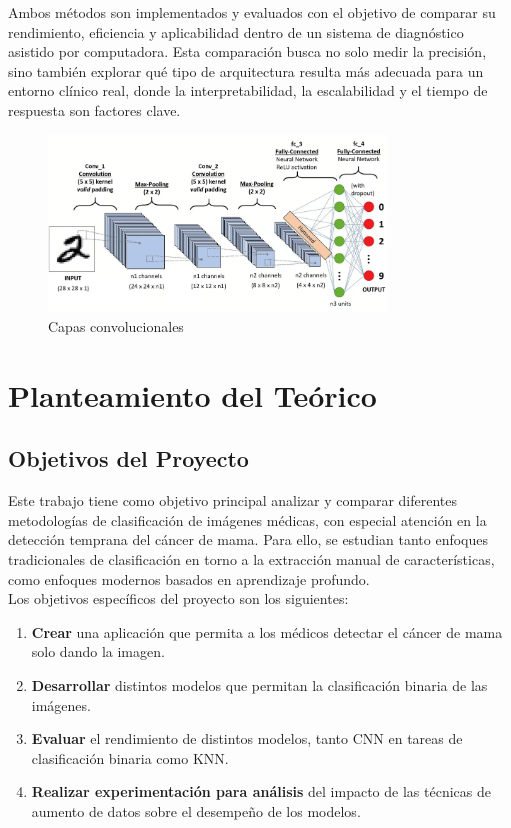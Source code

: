 \documentclass[12pt]{article} %
\begin{document}
Ambos métodos son implementados y evaluados con el objetivo de comparar su rendimiento, eficiencia y aplicabilidad dentro de un sistema de diagnóstico asistido por computadora. Esta comparación busca no solo medir la precisión, sino también explorar qué tipo de arquitectura resulta más adecuada para un entorno clínico real, donde la interpretabilidad, la escalabilidad y el tiempo de respuesta son factores clave.
\\

\begin{figure}[!ht]
    \centering
    \includegraphics[width=0.8\textwidth]{CNN.png}
    \caption{Capas convolucionales \cite{datacamp_cnn}}
    \label{fig:capas_convolucionales}
\end{figure}

\newpage
\section{Planteamiento del Teórico}
\subsection{Objetivos del Proyecto}

Este trabajo tiene como objetivo principal analizar y comparar diferentes metodologías de clasificación de imágenes médicas, con especial atención en la detección temprana del cáncer de mama. Para ello, se estudian tanto enfoques tradicionales de clasificación en torno a la extracción manual de características, como enfoques modernos basados en aprendizaje profundo.\\

Los objetivos específicos del proyecto son los siguientes:\\

\begin{enumerate}
    \item \textbf{Crear} una aplicación que permita a los médicos detectar el cáncer de mama solo dando la imagen.
    \item \textbf{Desarrollar} distintos modelos que permitan la clasificación binaria de las imágenes.
    \item \textbf{Evaluar} el rendimiento de distintos modelos, tanto CNN en tareas de clasificación binaria como KNN.
    \item \textbf{Realizar experimentación para análisis} del  impacto de las técnicas de aumento de datos sobre el desempeño de los modelos.
\end{enumerate}
\end{document}
